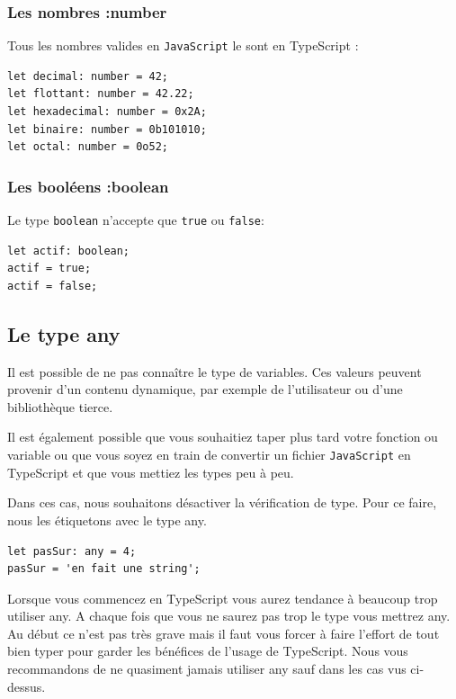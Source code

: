 \documentclass{article}
\begin{document}
\subsubsection{Les nombres :number}
Tous les nombres valides en {\tt JavaScript} le sont en {\color{monOrange}TypeScript} :
\begin{verbatim}
let decimal: number = 42;
let flottant: number = 42.22;
let hexadecimal: number = 0x2A;
let binaire: number = 0b101010;
let octal: number = 0o52;
\end{verbatim}

\subsubsection{Les booléens :boolean}
Le type {\tt boolean} n'accepte que {\tt true} ou {\tt false}:
\begin{verbatim}
let actif: boolean;
actif = true;
actif = false;
\end{verbatim}

\subsection{Le type any}
Il est possible de ne pas connaître le type de variables. Ces valeurs peuvent provenir d'un contenu dynamique, par exemple de l'utilisateur ou d'une bibliothèque tierce.

Il est également possible que vous souhaitiez taper plus tard votre fonction ou variable ou que vous soyez en train de convertir un fichier {\tt JavaScript} en {\color{monOrange}TypeScript} et que vous mettiez les types peu à peu.

Dans ces cas, nous souhaitons désactiver la vérification de type. Pour ce faire, nous les étiquetons avec le type {\color{blue}any}.
\begin{verbatim}
let pasSur: any = 4;
pasSur = 'en fait une string';
\end{verbatim}

Lorsque vous commencez en {\color{monOrange}TypeScript} vous aurez tendance à beaucoup trop utiliser {\color{blue} any}. A chaque fois que vous ne saurez pas trop le type vous mettrez {\color{blue} any}. Au début ce n'est pas très grave mais il faut vous forcer à faire l'effort de tout bien typer pour garder les bénéfices de l'usage de  {\color{monOrange}TypeScript}. Nous vous recommandons de ne quasiment jamais utiliser {\color{blue} any} sauf dans les cas vus ci-dessus.
\end{document}
